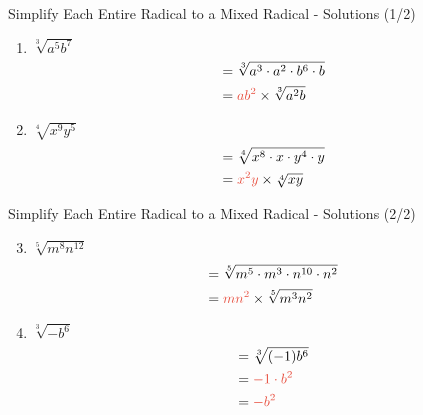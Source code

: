\documentclass[aspectratio=169]{beamer}
\begin{document}
\begin{frame}{Simplify Each Entire Radical to a Mixed Radical - Solutions (1/2)}
\begin{tcolorbox}[colback=lightgray,colframe=primary,title=Solutions]
\footnotesize
\begin{enumerate}
  \item $\sqrt[3]{a^5 b^7}$
  \begin{align*}
    &= \sqrt[3]{a^3 \cdot a^2 \cdot b^6 \cdot b} \\
    &= \textcolor{accent}{a b^2} \times \sqrt[3]{a^2 b}
  \end{align*}
  \item $\sqrt[4]{x^9 y^5}$
  \begin{align*}
    &= \sqrt[4]{x^8 \cdot x \cdot y^4 \cdot y} \\
    &= \textcolor{accent}{x^2 y} \times \sqrt[4]{x y}
  \end{align*}
\end{enumerate}
\end{tcolorbox}
\end{frame}

\begin{frame}{Simplify Each Entire Radical to a Mixed Radical - Solutions (2/2)}
\begin{tcolorbox}[colback=lightgray,colframe=primary,title=Solutions]
\footnotesize
\begin{enumerate}
  \setcounter{enumi}{2}
  \item $\sqrt[5]{m^8 n^{12}}$
  \begin{align*}
    &= \sqrt[5]{m^5 \cdot m^3 \cdot n^{10} \cdot n^2} \\
    &= \textcolor{accent}{m n^2} \times \sqrt[5]{m^3 n^2}
  \end{align*}
  \item $\sqrt[3]{-b^6}$
  \begin{align*}
    &= \sqrt[3]{(-1) b^6} \\
    &= \textcolor{accent}{-1 \cdot b^2} \\
    &= \textcolor{accent}{-b^2}
  \end{align*}
\end{enumerate}
\end{tcolorbox}
\end{frame}
\end{document}

